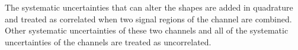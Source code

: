 

\noindent The systematic uncertainties that can alter the shapes are added in quadrature and 
treated as correlated when two signal regions of the \tauTau channel are combined. Other systematic uncertainties of these two 
channels and all of the systematic uncertainties of the \leptonTau channels are treated as uncorrelated.


